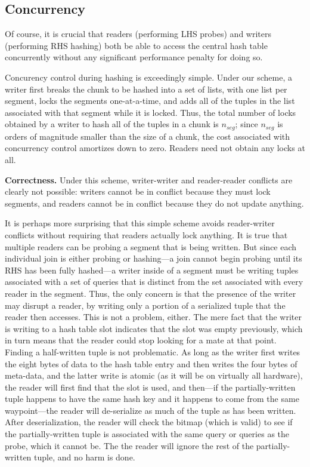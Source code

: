 \documentclass{sig-alternate}
\renewcommand\:{\colon} %
\begin{document}
\subsection{Concurrency}

Of course, it is crucial that readers (performing LHS probes) 
and writers (performing RHS hashing) both be able to access the central hash table concurrently without any significant
performance penalty for doing so.  

Concurency control during hashing is exceedingly simple.
Under our scheme, a writer first breaks the chunk to be hashed into a set of 
lists, with one list per segment, locks the segments one-at-a-time, and adds all of the tuples in the list associated
with that segment while it is locked.
Thus, the total number of locks obtained by a writer to hash all of the tuples in a chunk is $n_{seg}$; since $n_{seg}$
is orders of magnitude smaller than the size of a chunk, the cost associated with concurrency control amortizes down to zero.
Readers need not obtain any locks at all.

\vspace{5 pt}
\noindent
\textbf{Correctness.}
Under this scheme, writer-writer and reader-reader conflicts are clearly not possible: writers cannot be in conflict
because they must lock segments, and readers cannot be in conflict because they do not update anything.  

It is perhaps more surprising
that this simple scheme avoids reader-writer conflicts without requiring that readers actually lock anything.
It is true that multiple readers can be probing a segment that is being written.  But since each individual join is either
probing or hashing---a join cannot begin probing until its RHS has been fully hashed---a writer inside of a segment must be
writing tuples associated with a set of queries that is distinct from the set associated with every reader in the segment.
Thus, the only concern is that the presence of the writer may disrupt a reader, by writing only a portion of a serialized
tuple that the reader then accesses.  This is not a problem, either.  The mere fact that the writer is writing to a hash
table slot indicates that the slot was empty previously, which in turn means that the reader could stop looking for a mate
at that point.  Finding a half-written tuple is not problematic.
As long as the writer first writes the eight bytes of data to the hash table entry and then writes the
four bytes of meta-data, and the latter write is atomic (as it will be on virtually all hardware), 
the reader will first find that the slot is used, and then---if the partially-written tuple happens to have the same hash key and it happens to 
come from the same waypoint---the reader will de-serialize as much of the tuple as has been written.  
After deserialization, the reader will check the bitmap (which is valid)
to see if the partially-written tuple is associated with the same query or
queries as the probe, which it cannot be.  The the reader will ignore the rest of the partially-written tuple,
and no harm is done.
\end{document}
